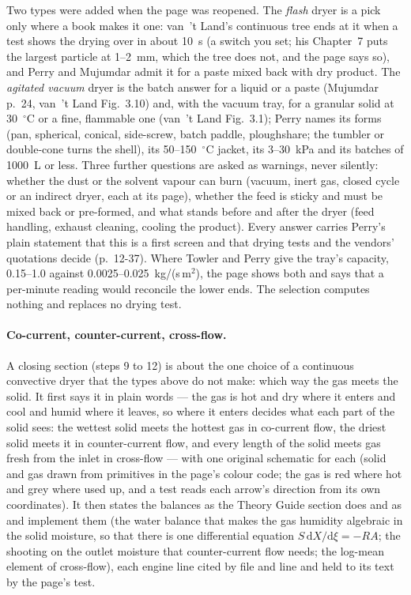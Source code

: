 \documentclass[11pt,a4paper]{article}
\begin{document}
Two types were added when the page was reopened.  The \emph{flash} dryer is a pick
only where a book makes it one: van~'t Land's continuous tree ends at it when a test
shows the drying over in about 10~s (a switch you set; his Chapter~7 puts the largest
particle at 1--2~mm, which the tree does not, and the page says so), and Perry and
Mujumdar admit it for a paste mixed back with dry product.  The \emph{agitated
vacuum} dryer is the batch answer for a liquid or a paste (Mujumdar p.~24, van~'t Land
Fig.~3.10) and, with the vacuum tray, for a granular solid at 30~$^\circ$C or a fine,
flammable one (van~'t Land Fig.~3.1); Perry names its forms (pan, spherical, conical,
side-screw, batch paddle, ploughshare; the tumbler or double-cone turns the shell),
its 50--150~$^\circ$C jacket, its 3--30~kPa and its batches of 1000~L or less.  Three
further questions are asked as warnings, never silently: whether the dust or the
solvent vapour can burn (vacuum, inert gas, closed cycle or an indirect dryer, each
at its page), whether the feed is sticky and must be mixed back or pre-formed, and
what stands before and after the dryer (feed handling, exhaust cleaning, cooling the
product).  Every answer carries Perry's plain statement that this is a first screen
and that drying tests and the vendors' quotations decide (p.~12-37).  Where Towler
and Perry give the tray's capacity, 0.15--1.0 against 0.0025--0.025~kg/(s\,m$^2$),
the page shows both and says that a per-minute reading would reconcile the lower
ends.  The selection computes nothing and replaces no
drying test.

\paragraph{Co-current, counter-current, cross-flow.}  A closing section (steps
9 to 12) is about the one choice of a continuous convective dryer that the
types above do not make: which way the gas meets the solid.  It first says it
in plain words --- the gas is hot and dry where it enters and cool and humid
where it leaves, so where it enters decides what each part of the solid sees:
the wettest solid meets the hottest gas in co-current flow, the driest solid
meets it in counter-current flow, and every length of the solid meets gas fresh
from the inlet in cross-flow --- with one original schematic for each (solid and
gas drawn from primitives in the page's colour code; the gas is red where hot and
grey where used up, and a test reads each arrow's direction from its own
coordinates).  It then states the balances as the Theory Guide section
 does and as  and
 implement them (the water balance that makes the
gas humidity algebraic in the solid moisture, so that there is one differential
equation $S\,\mathrm{d}X/\mathrm{d}\xi=-RA$; the shooting on the outlet moisture
that counter-current flow needs; the log-mean element of cross-flow), each
engine line cited by file and line and held to its text by the page's test.
\end{document}
